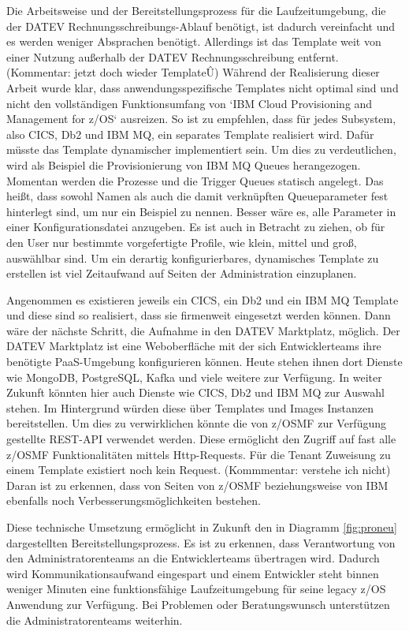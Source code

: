 Die Arbeitsweise und der Bereitstellungsprozess für die Laufzeitumgebung, die der DATEV Rechnungsschreibungs-Ablauf benötigt, ist dadurch vereinfacht und es werden weniger Absprachen benötigt.
Allerdings ist das Template weit von einer Nutzung außerhalb der DATEV Rechnungsschreibung entfernt. (Kommentar: jetzt doch wieder TemplateÛ) 
Während der Realisierung dieser Arbeit wurde klar, dass anwendungsspezifische Templates nicht optimal sind und nicht den vollständigen Funktionsumfang von `IBM Cloud Provisioning and Management for z/OS` ausreizen.
So ist zu empfehlen, dass für jedes Subsystem, also CICS, Db2 und IBM MQ, ein separates Template realisiert wird.
Dafür müsste das Template dynamischer implementiert sein.
Um dies zu verdeutlichen, wird als Beispiel die Provisionierung von IBM MQ Queues herangezogen.
Momentan werden die Prozesse und die Trigger Queues  statisch angelegt.
Das heißt, dass sowohl Namen als auch die damit verknüpften Queueparameter fest hinterlegt sind, um nur ein Beispiel zu nennen.
Besser wäre es,  alle Parameter in einer Konfigurationsdatei anzugeben.
Es ist auch in Betracht zu ziehen, ob für den User nur bestimmte vorgefertigte Profile, wie \glqq klein\grqq, \glqq mittel\grqq{} und \glqq groß\grqq, auswählbar sind.
Um ein derartig konfigurierbares, dynamisches Template zu erstellen ist viel Zeitaufwand auf Seiten der Administration einzuplanen.

Angenommen es existieren jeweils ein CICS, ein Db2 und ein IBM MQ Template und diese sind so realisiert, dass sie firmenweit eingesetzt werden können.
Dann wäre der nächste Schritt, die Aufnahme in den \glqq DATEV Marktplatz\grqq, möglich.
Der \glqq DATEV Marktplatz\grqq{} ist eine Weboberfläche mit der sich Entwicklerteams ihre benötigte PaaS-Umgebung konfigurieren können.
Heute stehen ihnen dort Dienste wie MongoDB, PostgreSQL, Kafka und viele weitere zur Verfügung.
In weiter Zukunft könnten hier auch Dienste wie CICS, Db2 und IBM MQ zur Auswahl stehen.
Im Hintergrund würden diese über Templates und Images Instanzen bereitstellen.
Um dies zu verwirklichen könnte die von z/OSMF zur Verfügung gestellte REST-API verwendet werden.
Diese ermöglicht den Zugriff auf fast alle z/OSMF Funktionalitäten mittels Http-Requests.
Für die \glqq Tenant\grqq{} Zuweisung zu einem Template existiert noch kein Request. (Kommmentar: verstehe ich nicht)
Daran ist zu erkennen, dass von Seiten von z/OSMF beziehungsweise von IBM ebenfalls noch Verbesserungsmöglichkeiten bestehen.

Diese technische Umsetzung ermöglicht in Zukunft den in Diagramm \ref{fig:proneu} dargestellten Bereitstellungsprozess.
Es ist zu erkennen, dass Verantwortung von den Administratorenteams an die Entwicklerteams übertragen wird.
Dadurch wird Kommunikationsaufwand eingespart und einem Entwickler steht binnen weniger Minuten eine funktionsfähige Laufzeitumgebung für seine legacy z/OS Anwendung zur Verfügung.
Bei Problemen oder Beratungswunsch unterstützen die Administratorenteams weiterhin.

